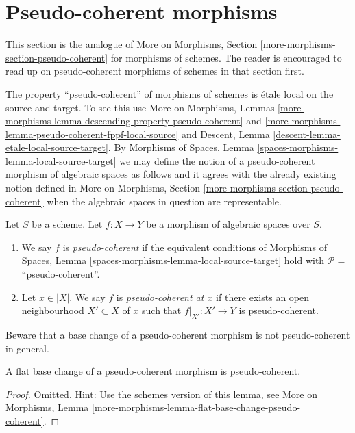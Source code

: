 \section{Pseudo-coherent morphisms}
\label{section-pseudo-coherent}

\noindent
This section is the analogue of
More on Morphisms, Section \ref{more-morphisms-section-pseudo-coherent}
for morphisms of schemes. The reader is encouraged to read up
on pseudo-coherent morphisms of schemes in that section first.

\medskip\noindent
The property ``pseudo-coherent'' of morphisms of schemes is
\'etale local on the source-and-target. To see this use
More on Morphisms,
Lemmas \ref{more-morphisms-lemma-descending-property-pseudo-coherent} and
\ref{more-morphisms-lemma-pseudo-coherent-fppf-local-source}
and
Descent, Lemma \ref{descent-lemma-etale-local-source-target}.
By
Morphisms of Spaces,
Lemma \ref{spaces-morphisms-lemma-local-source-target}
we may define the notion of a pseudo-coherent morphism of algebraic spaces as
follows and it agrees with the already existing notion defined in
More on Morphisms, Section \ref{more-morphisms-section-pseudo-coherent}
when the algebraic spaces in question are representable.

\begin{definition}
\label{definition-pseudo-coherent}
Let $S$ be a scheme.
Let $f : X \to Y$ be a morphism of algebraic spaces over $S$.
\begin{enumerate}
\item We say $f$ is {\it pseudo-coherent} if the equivalent conditions of
Morphisms of Spaces, Lemma \ref{spaces-morphisms-lemma-local-source-target}
hold with $\mathcal{P} =$``pseudo-coherent''.
\item Let $x \in |X|$. We say $f$ is {\it pseudo-coherent at $x$} if
there exists an open neighbourhood $X' \subset X$ of $x$ such
that $f|_{X'} : X' \to Y$ is pseudo-coherent.
\end{enumerate}
\end{definition}

\noindent
Beware that a base change of a pseudo-coherent morphism is not
pseudo-coherent in general.

\begin{lemma}
\label{lemma-flat-base-change-pseudo-coherent}
A flat base change of a pseudo-coherent morphism is pseudo-coherent.
\end{lemma}

\begin{proof}
Omitted. Hint: Use the schemes version of this lemma, see
More on Morphisms,
Lemma \ref{more-morphisms-lemma-flat-base-change-pseudo-coherent}.
\end{proof}

